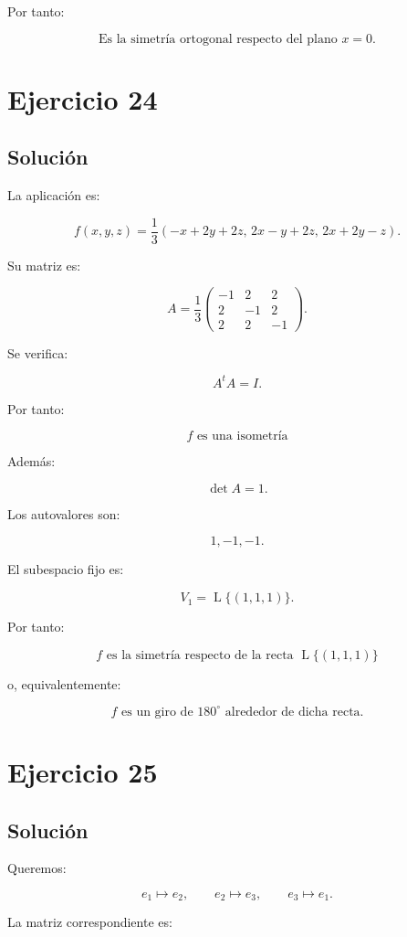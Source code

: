\documentclass[11pt,a4paper]{article}
\newcommand{\Span}{\operatorname{L}}
\begin{document}
Por tanto:

\[
\boxed{
\text{Es la simetría ortogonal respecto del plano }x=0.
}
\]

\section{Ejercicio 24}
\subsection{Solución}

La aplicación es:

\[
f(x,y,z)
=
\frac13
(-x+2y+2z,\,
2x-y+2z,\,
2x+2y-z).
\]

Su matriz es:

\[
A=
\frac13
\begin{pmatrix}
-1&2&2\\
2&-1&2\\
2&2&-1
\end{pmatrix}.
\]

Se verifica:

\[
A^tA=I.
\]

Por tanto:

\[
\boxed{
f\text{ es una isometría}
}
\]

Además:

\[
\det A=1.
\]

Los autovalores son:

\[
1,-1,-1.
\]

El subespacio fijo es:

\[
V_1
=
\Span\{(1,1,1)\}.
\]

Por tanto:

\[
\boxed{
f\text{ es la simetría respecto de la recta }
\Span\{(1,1,1)\}
}
\]

o, equivalentemente:

\[
\boxed{
f\text{ es un giro de }180^\circ
\text{ alrededor de dicha recta.}
}
\]

\section{Ejercicio 25}
\subsection{Solución}

Queremos:

\[
e_1\longmapsto e_2,
\qquad
e_2\longmapsto e_3,
\qquad
e_3\longmapsto e_1.
\]

La matriz correspondiente es:
\end{document}
